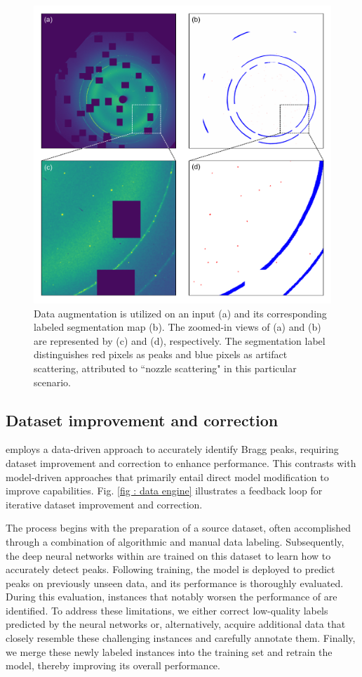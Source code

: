 \documentclass[a4paper]{article}
\begin{document}
\begin{figure}[!ht]
\includegraphics[width=\textwidth,keepaspectratio]
{./figures/data_aug.pdf}
\caption{Data augmentation is utilized on an input (a) and its corresponding
labeled segmentation map (b). The zoomed-in views of (a) and (b) are represented
by (c) and (d), respectively. The segmentation label distinguishes red pixels as
peaks and blue pixels as artifact scattering, attributed to ``nozzle scattering"
in this particular scenario.}
\label{fig : data aug}
\end{figure}


\subsection{Dataset improvement and correction}

\peaknet{} employs a data-driven approach to accurately identify Bragg peaks,
requiring dataset improvement and correction to enhance performance.  This
contrasts with model-driven approaches that primarily entail direct model
modification to improve capabilities.  Fig. \ref{fig : data engine} illustrates
a feedback loop for iterative dataset improvement and correction.  

The process begins with the preparation of a source dataset, often accomplished
through a combination of algorithmic and manual data labeling.  Subsequently,
the deep neural networks within \peaknet{} are trained on this dataset to learn
how to accurately detect peaks.  Following training, the model is deployed to
predict peaks on previously unseen data, and its performance is thoroughly
evaluated.  During this evaluation, instances that notably worsen the
performance of \peaknet{} are identified.  To address these limitations, we
either correct low-quality labels predicted by the neural networks or,
alternatively, acquire additional data that closely resemble these challenging
instances and carefully annotate them.  Finally, we merge these newly labeled
instances into the training set and retrain the model, thereby improving its
overall performance.  
\end{document}
